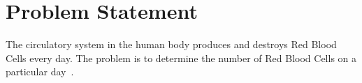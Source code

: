 \section{Problem Statement}
\label{sec:problem-statement}

The circulatory system in the human body produces and destroys Red Blood Cells every day. The problem is to determine the number of Red Blood Cells on a particular day~\cite{book1}.
